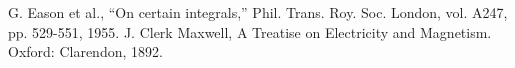 \documentclass[conference]{IEEEtran}
\begin{document}







\balance %

\begin{thebibliography}{9}
 G. Eason et al., ``On certain integrals,'' Phil. Trans. Roy. Soc. London, vol. A247, pp. 529-551, 1955.
 J. Clerk Maxwell, A Treatise on Electricity and Magnetism. Oxford: Clarendon, 1892.
\end{thebibliography}
\end{document}
